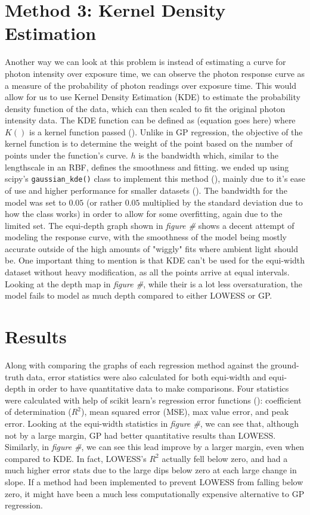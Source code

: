 \documentclass[letterpaper,12pt]{article}
\begin{document}
\section{Method 3: Kernel Density Estimation}
Another way we can look at this problem is instead of estimating a curve for photon intensity
over exposure time, we can observe the photon response curve as a measure of the probability of 
photon readings over exposure time. This would allow for us to use Kernel Density Estimation (KDE)
to estimate the probability density function of the data, which can then scaled to fit the 
original photon intensity data. The KDE function can be defined as (equation goes here) where
$K()$ is a kernel function passed (\cite{chen2018lecture}). Unlike in GP regression, the 
objective of the kernel function is to determine the weight of the point based on the number 
of points under the function's curve. $h$ is the bandwidth which, similar to the lengthscale 
in an RBF, defines the smoothness and fitting. we ended up using scipy's \verb|gaussian_kde()| 
class to implement this method (\cite{virtanen2020scipy}), mainly due to it's ease of use 
and higher performance for smaller datasets (\cite{VanderPlas_2023}). The bandwidth for the
model was set to $0.05$ (or rather $0.05$ multiplied by the standard deviation due to how
the class works) in order to allow for some overfitting, again due to the limited set.
The equi-depth graph shown in \emph{figure \#} shows a decent attempt of modeling the response
curve, with the smoothness of the model being mostly accurate outside of the high amounts
of "wiggly" fits where ambient light should be. One important thing to mention is that 
KDE can't be used for the equi-width dataset without heavy modification, as all the points
arrive at equal intervals. Looking at the depth map in \emph{figure \#}, while their is a lot
less oversaturation, the model fails to model as much depth compared to either LOWESS or GP.

\section{Results}
Along with comparing the graphs of each regression method against the ground-truth data,
error statistics were also calculated for both equi-width and equi-depth in order to 
have quantitative data to make comparisons. Four statistics were calculated with help of
scikit learn's regression error functions (\cite{scikit-learn}): coefficient of determination
($R^2$), mean squared error (MSE), max value error, and peak error. Looking at the equi-width
statistics in \emph{figure \#}, we can see that, although not by a large margin, GP had
better quantitative results than LOWESS. Similarly, in \emph{figure \#}, we can see this lead
improve by a larger margin, even when compared to KDE. In fact, LOWESS's $R^2$ actually fell
below zero, and had a much higher error stats due to the large dips below zero at each
large change in slope. If a method had been implemented to prevent LOWESS from falling below
zero, it might have been a much less computationally expensive alternative to GP regression.
\end{document}
